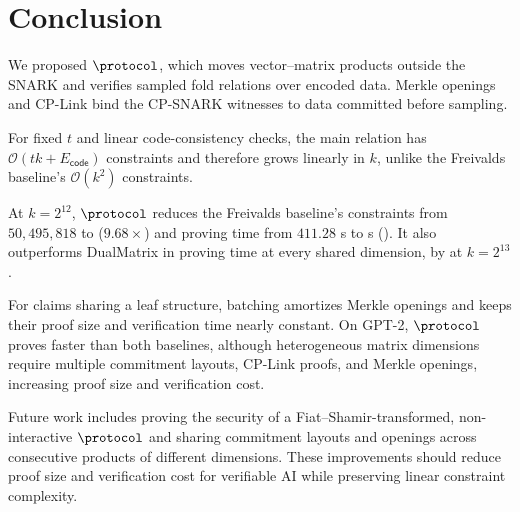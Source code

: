 \section{Conclusion}
  \label{sec:conclusion}

  We proposed \(\protocol\), which moves vector--matrix products outside the
  SNARK and verifies sampled fold relations over encoded data. Merkle openings
  and CP-Link bind the CP-SNARK witnesses to data committed before sampling.

  For fixed \(t\) and linear code-consistency checks, the main relation has
  \(\mathcal{O}(tk+E_{\mathsf{code}})\) constraints and therefore grows linearly
  in \(k\), unlike the Freivalds baseline's \(\mathcal{O}(k^2)\) constraints.

  \begin{revblock}
  At \(k=2^{12}\), \(\protocol\) reduces the Freivalds baseline's constraints
  from \(50{,}495{,}818\) to  (\(9.68\times\)) and proving time
  from \(411.28\) s to  s (\revmath{5.81\times}). It also outperforms
  DualMatrix in proving time at every shared dimension, by \revmath{3.62\times} at
  \(k=2^{13}\).
  \end{revblock}

  \begin{revblock}
  For claims sharing a leaf structure, batching amortizes Merkle openings and
  keeps their proof size and verification time nearly constant. On GPT-2,
  \(\protocol\) proves faster than both baselines, although heterogeneous matrix
  dimensions require multiple commitment layouts, CP-Link proofs, and Merkle
  openings, increasing proof size and verification cost.
  \end{revblock}

  \begin{revblock}
  Future work includes proving the security of a Fiat--Shamir-transformed,
  non-interactive \(\protocol\) and sharing commitment layouts and openings across
  consecutive products of different dimensions. These improvements should reduce
  proof size and verification cost for verifiable AI while preserving linear
  constraint complexity.
  \end{revblock}